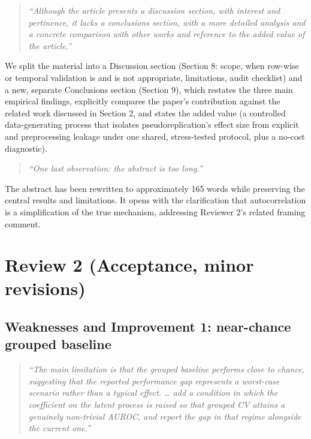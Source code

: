\documentclass[11pt]{article}
\newcommand{\rc}[1]{\textit{``#1''}}
\newenvironment{response}{\begin{quote}\color{black}}{\end{quote}}
\begin{document}
\begin{response}
\rc{Although the article presents a discussion section, with interest and pertinence, it lacks a conclusions section, with a more detailed analysis and a concrete comparison with other works and reference to the added value of the article.}
\end{response}

We split the material into a Discussion section (Section 8: scope, when row-wise or temporal validation is and is not appropriate, limitations, audit checklist) and a new, separate Conclusions section (Section 9), which restates the three main empirical findings, explicitly compares the paper's contribution against the related work discussed in Section 2, and states the added value (a controlled data-generating process that isolates pseudoreplication's effect size from explicit and preprocessing leakage under one shared, stress-tested protocol, plus a no-cost diagnostic).

\begin{response}
\rc{One last observation: the abstract is too long.}
\end{response}

The abstract has been rewritten to approximately 165 words while preserving the central results and limitations. It opens with the clarification that autocorrelation is a simplification of the true mechanism, addressing Reviewer 2's related framing comment.

\section*{Review 2 (Acceptance, minor revisions)}

\subsection*{Weaknesses and Improvement 1: near-chance grouped baseline}

\begin{response}
\rc{The main limitation is that the grouped baseline performs close to chance, suggesting that the reported performance gap represents a worst-case scenario rather than a typical effect. \dots{} add a condition in which the coefficient on the latent process is raised so that grouped CV attains a genuinely non-trivial AUROC, and report the gap in that regime alongside the current one.}
\end{response}
\end{document}
